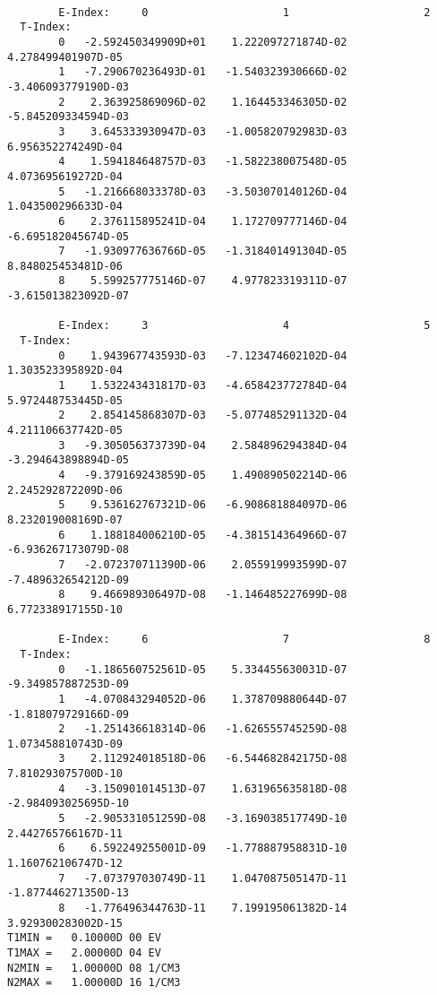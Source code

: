 \documentclass[12pt,dvipdfmx]{article}
\begin{document}
{\begin{small}\begin{verbatim}

        E-Index:     0                     1                     2
  T-Index:
        0   -2.592450349909D+01    1.222097271874D-02    4.278499401907D-05
        1   -7.290670236493D-01   -1.540323930666D-02   -3.406093779190D-03
        2    2.363925869096D-02    1.164453346305D-02   -5.845209334594D-03
        3    3.645333930947D-03   -1.005820792983D-03    6.956352274249D-04
        4    1.594184648757D-03   -1.582238007548D-05    4.073695619272D-04
        5   -1.216668033378D-03   -3.503070140126D-04    1.043500296633D-04
        6    2.376115895241D-04    1.172709777146D-04   -6.695182045674D-05
        7   -1.930977636766D-05   -1.318401491304D-05    8.848025453481D-06
        8    5.599257775146D-07    4.977823319311D-07   -3.615013823092D-07

        E-Index:     3                     4                     5
  T-Index:
        0    1.943967743593D-03   -7.123474602102D-04    1.303523395892D-04
        1    1.532243431817D-03   -4.658423772784D-04    5.972448753445D-05
        2    2.854145868307D-03   -5.077485291132D-04    4.211106637742D-05
        3   -9.305056373739D-04    2.584896294384D-04   -3.294643898894D-05
        4   -9.379169243859D-05    1.490890502214D-06    2.245292872209D-06
        5    9.536162767321D-06   -6.908681884097D-06    8.232019008169D-07
        6    1.188184006210D-05   -4.381514364966D-07   -6.936267173079D-08
        7   -2.072370711390D-06    2.055919993599D-07   -7.489632654212D-09
        8    9.466989306497D-08   -1.146485227699D-08    6.772338917155D-10

        E-Index:     6                     7                     8
  T-Index:
        0   -1.186560752561D-05    5.334455630031D-07   -9.349857887253D-09
        1   -4.070843294052D-06    1.378709880644D-07   -1.818079729166D-09
        2   -1.251436618314D-06   -1.626555745259D-08    1.073458810743D-09
        3    2.112924018518D-06   -6.544682842175D-08    7.810293075700D-10
        4   -3.150901014513D-07    1.631965635818D-08   -2.984093025695D-10
        5   -2.905331051259D-08   -3.169038517749D-10    2.442765766167D-11
        6    6.592249255001D-09   -1.778887958831D-10    1.160762106747D-12
        7   -7.073797030749D-11    1.047087505147D-11   -1.877446271350D-13
        8   -1.776496344763D-11    7.199195061382D-14    3.929300283002D-15
T1MIN =   0.10000D 00 EV
T1MAX =   2.00000D 04 EV
N2MIN =   1.00000D 08 1/CM3
N2MAX =   1.00000D 16 1/CM3


\end{verbatim}
\end{small}}
\end{document}
